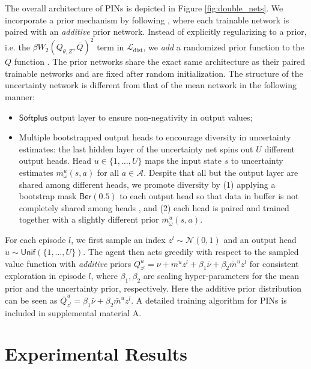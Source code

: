 \documentclass[letterpaper]{article} %
\newcommand{\Sp}[1]{\left(#1\right)}
\theoremstyle{definition}
\begin{document}
The overall architecture of PINs is depicted in Figure \ref{fig:double_nets}. We incorporate a prior mechanism by following \cite{osband2018randomized}, where each trainable network is paired with an \emph{additive} prior network. Instead of explicitly regularizing to a prior, i.e. the $\beta W_2\Sp{Q_{\theta, Z}, \overline{Q}}^2$ term in $\mathcal{L}_{\mathrm{dist}}$, we \emph{add} a randomized prior function to the $Q$ function \cite{osband2018randomized}. The prior networks share the exact same architecture as their paired trainable networks and are fixed after random initialization. The structure of the uncertainty network is different from that of the mean network in the following manner:
\begin{itemize}
    \item $\mathsf{Softplus}$ \cite{glorot2011deep} output layer to ensure non-negativity in output
    values;
    \item Multiple bootstrapped output heads to encourage diversity in uncertainty estimates: the last hidden layer of the uncertainty net spins out $U$ different output heads. Head $u \in \{1, \dots, U\}$ maps the input state $s$ to uncertainty estimates $m_\omega^u (s, a)$ for all $a \in \mathcal{A}$. Despite that all but the output layer are shared among different heads, we promote diversity by (1) applying a bootstrap mask $\mathsf{Ber}(0.5)$ to each output head so that data in buffer is not completely shared among heads \cite{osband2016deep}, and (2) each head is paired and trained together with a slightly different prior $\bar{m}_{\bar{\omega}}^u(s,a)$.
\end{itemize}
For each episode $l$, we first sample an index $z^l \sim \mathcal{N}(0, 1)$ and an output head $u \sim \mathsf{Unif}(\{1, \dots, U\})$. The agent then acts greedily with respect to the sampled value function with \emph{additive} priors $Q^u_{z^l} = \nu + m^u z^l + \beta_1 \bar{\nu} + \beta_2 \bar{m}^u z^l$ for consistent exploration in episode $l$, where $\beta_1, \beta_2$ are scaling hyper-parameters for the mean prior and the uncertainty prior, respectively. Here the additive prior distribution can be seen as $\overline{Q}^u_{z^l} = \beta_1 \bar{\nu} + \beta_2 \bar{m}^u z^l$. A detailed training algorithm for PINs is included in supplemental material A.

\section{Experimental Results}
\end{document}
